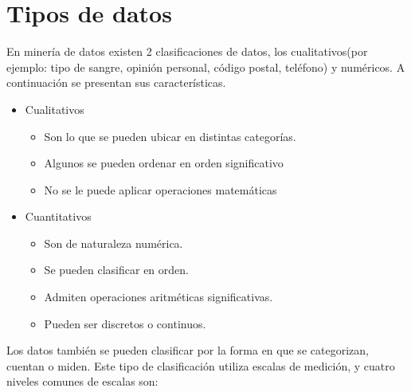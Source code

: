 \section{Tipos de datos}

En miner\'ia de datos existen 2 clasificaciones de datos\cite{Yang2010}, los cualitativos(por ejemplo: tipo de sangre, opini\'on personal, c\'odigo postal, tel\'efono) y num\'ericos. A continuaci\'on se presentan sus caracter\'isticas.

\begin{itemize}
\item Cualitativos\cite{Yang2010} 
	\begin{itemize}
	\item Son lo que se pueden ubicar en distintas  categor\'ias.
	\item Algunos se pueden ordenar en orden significativo
	\item No se le puede aplicar operaciones matem\'aticas
	\end{itemize}
	 

\item Cuantitativos\cite{Yang2010}
	\begin{itemize}
	\item Son de naturaleza num\'erica. 
	\item Se pueden clasificar en orden. 
	\item Admiten operaciones aritm\'eticas significativas. 
	\item Pueden ser discretos o continuos.		
	\end{itemize}
\end{itemize}

Los datos tambi\'en se pueden clasificar por la forma en que se categorizan, cuentan o miden. Este tipo de clasificaci\'on utiliza escalas de medici\'on, y cuatro niveles comunes de escalas son: 

